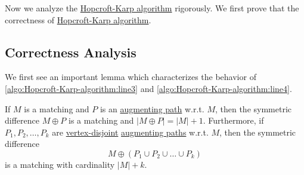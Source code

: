 Now we analyze the \hyperref[algo:Hopcroft-Karp-algorithm]{Hopcroft-Karp algorithm} rigorously. We first prove that the correctness of
\hyperref[algo:Hopcroft-Karp-algorithm]{Hopcroft-Karp algorithm}.

\subsection{Correctness Analysis}
We first see an important lemma which characterizes the behavior of \autoref{algo:Hopcroft-Karp-algorithm:line3} and \autoref{algo:Hopcroft-Karp-algorithm:line4}.
\begin{lemma}\label{lma:lec25-1}
	If \(M\) is a matching and \(P\) is an \hyperref[def:augmenting-path]{augmenting path} w.r.t. \(M\), then the symmetric difference
	\(M\oplus P\) is a matching and \(\left\vert M\oplus P \right\vert = \left\vert M \right\vert + 1\). Furthermore, if
	\(P_1, P_2, \ldots  , P_k\) are \hyperref[def:vertex-independent]{vertex-disjoint} \hyperref[def:augmenting-path]{augmenting paths}
	w.r.t. \(M\), then the symmetric difference
	\[
		M\oplus(P_1 \cup P_2 \cup  \ldots  \cup  P_k  )
	\]
	is a matching with cardinality \(\left\vert M \right\vert + k\).
\end{lemma}
